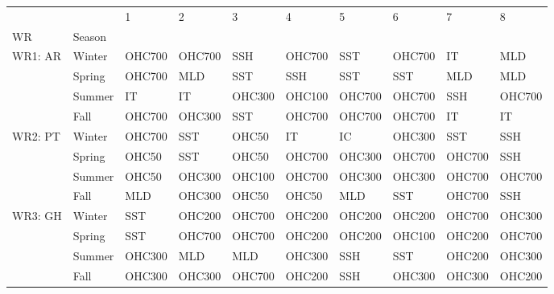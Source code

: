\begin{tabular}{llllllllll}
\toprule
        &      &       1 &       2 &       3 &       4 &       5 &       6 &       7 &       8 \\
WR & Season &         &         &         &         &         &         &         &         \\
\midrule
\multirow{4}{*}{WR1: AR} & Winter &  OHC700 &  OHC700 &     SSH &  OHC700 &     SST &  OHC700 &      IT &     MLD \\
        & Spring &  OHC700 &     MLD &     SST &     SSH &     SST &     SST &     MLD &     MLD \\
        & Summer &      IT &      IT &  OHC300 &  OHC100 &  OHC700 &  OHC700 &     SSH &  OHC700 \\
        & Fall &  OHC700 &  OHC300 &     SST &  OHC700 &  OHC700 &  OHC700 &      IT &      IT \\
\cline{1-10}
\multirow{4}{*}{WR2: PT} & Winter &  OHC700 &     SST &   OHC50 &      IT &      IC &  OHC300 &     SST &     SSH \\
        & Spring &   OHC50 &     SST &   OHC50 &  OHC700 &  OHC300 &  OHC700 &  OHC700 &     SSH \\
        & Summer &   OHC50 &  OHC300 &  OHC100 &  OHC700 &  OHC300 &  OHC300 &  OHC700 &  OHC700 \\
        & Fall &     MLD &  OHC300 &   OHC50 &   OHC50 &     MLD &     SST &  OHC700 &     SSH \\
\cline{1-10}
\multirow{4}{*}{WR3: GH} & Winter &     SST &  OHC200 &  OHC700 &  OHC200 &  OHC200 &  OHC200 &  OHC700 &  OHC300 \\
        & Spring &     SST &  OHC700 &  OHC700 &  OHC200 &  OHC200 &  OHC100 &  OHC200 &  OHC700 \\
        & Summer &  OHC300 &     MLD &     MLD &  OHC300 &     SSH &     SST &  OHC200 &  OHC300 \\
        & Fall &  OHC300 &  OHC300 &  OHC700 &  OHC200 &     SSH &  OHC300 &  OHC300 &  OHC200 \\
\bottomrule
\end{tabular}
